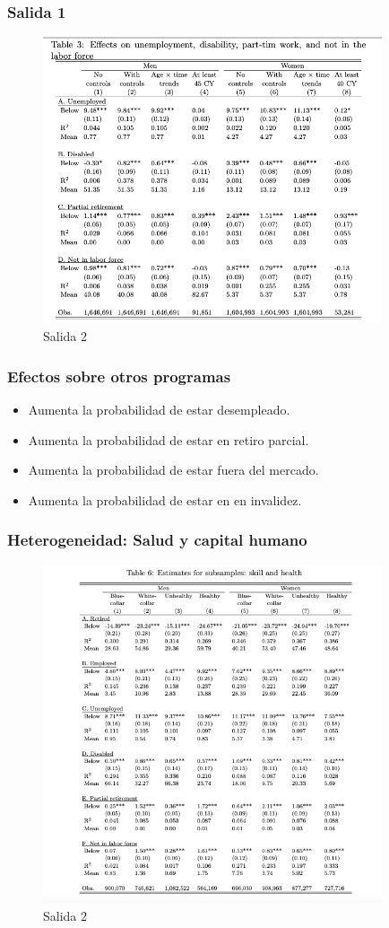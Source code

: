 \documentclass{beamer}
\begin{document}
  {
    \frametitle{Salida 1}
      \begin{figure}[htp]
        \centering
        \includegraphics[width=10cm]{imgs/staubli-tab3}
        \caption{Salida 2}
        \label{fig:fig2}
      \end{figure}
  }
  \frame
  {
    \frametitle{Efectos sobre otros programas}
    \begin{itemize}
    \item Aumenta la probabilidad de estar desempleado.
    \item Aumenta la probabilidad de estar en retiro parcial.
    \item Aumenta la probabilidad de estar fuera del mercado.
    \item Aumenta la probabilidad de estar en en invalidez.
    \end{itemize}
  }
  \frame
    {
    \frametitle{Heterogeneidad: Salud y capital humano}
      \begin{figure}[htp]
        \centering
        \includegraphics[width=10cm]{imgs/staubli-tab6}
        \caption{Salida 2}
        \label{fig:fig2}
      \end{figure}
  }
\end{document}
